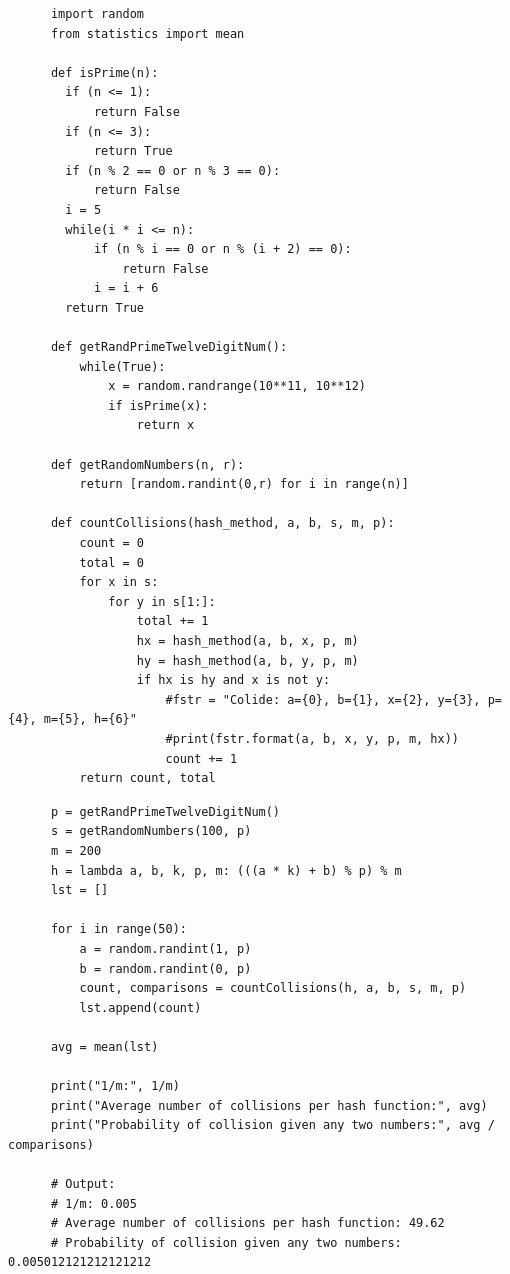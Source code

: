 \documentclass{article}
\begin{document}
\begin{enumerate}
    \begin{lstlisting}
      import random 
      from statistics import mean

      def isPrime(n): 
        if (n <= 1):
            return False
        if (n <= 3):
            return True
        if (n % 2 == 0 or n % 3 == 0):
            return False    
        i = 5
        while(i * i <= n):
            if (n % i == 0 or n % (i + 2) == 0):
                return False
            i = i + 6        
        return True
  
      def getRandPrimeTwelveDigitNum():
          while(True):
              x = random.randrange(10**11, 10**12)
              if isPrime(x):
                  return x
      
      def getRandomNumbers(n, r):
          return [random.randint(0,r) for i in range(n)]
      
      def countCollisions(hash_method, a, b, s, m, p):
          count = 0
          total = 0
          for x in s:
              for y in s[1:]:
                  total += 1
                  hx = hash_method(a, b, x, p, m)
                  hy = hash_method(a, b, y, p, m)
                  if hx is hy and x is not y:
                      #fstr = "Colide: a={0}, b={1}, x={2}, y={3}, p={4}, m={5}, h={6}"
                      #print(fstr.format(a, b, x, y, p, m, hx))
                      count += 1
          return count, total
    \end{lstlisting}

    \begin{lstlisting}
      p = getRandPrimeTwelveDigitNum()
      s = getRandomNumbers(100, p)
      m = 200
      h = lambda a, b, k, p, m: (((a * k) + b) % p) % m
      lst = []
      
      for i in range(50):
          a = random.randint(1, p)
          b = random.randint(0, p)    
          count, comparisons = countCollisions(h, a, b, s, m, p)
          lst.append(count)
      
      avg = mean(lst)    
          
      print("1/m:", 1/m)
      print("Average number of collisions per hash function:", avg)
      print("Probability of collision given any two numbers:", avg / comparisons)
      
      # Output:
      # 1/m: 0.005
      # Average number of collisions per hash function: 49.62
      # Probability of collision given any two numbers: 0.005012121212121212
    \end{lstlisting}

  \end{enumerate}
\end{document}
